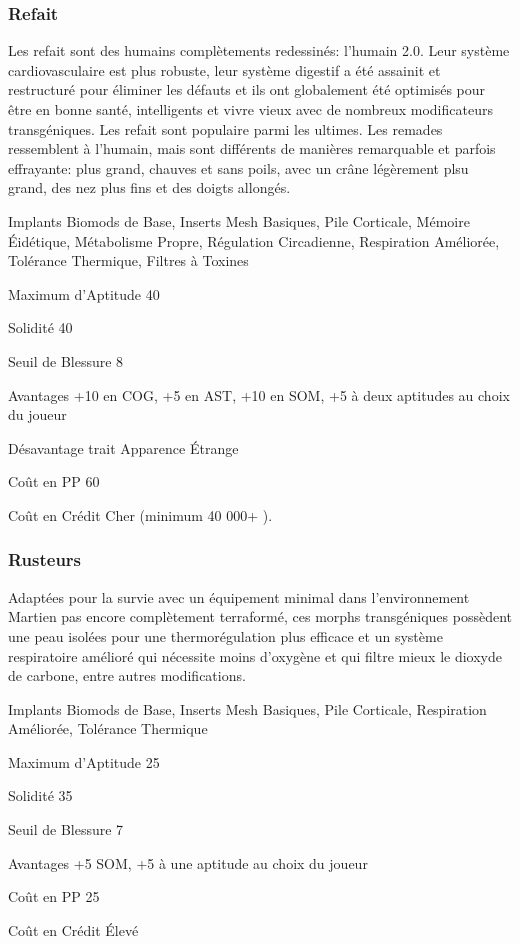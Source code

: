 \subsubsection{Refait} \label{sec:starting-remade} 

Les refait sont des humains complètements redessinés: l'humain 2.0. Leur système cardiovasculaire est plus robuste, leur système digestif a été assainit et restructuré pour éliminer les défauts et ils ont globalement été optimisés pour être en bonne santé, intelligents et vivre vieux avec de nombreux modificateurs transgéniques. Les refait sont populaire parmi les ultimes. Les remades ressemblent à l'humain, mais sont différents de manières remarquable et parfois effrayante: plus grand, chauves et sans poils, avec un crâne légèrement plsu grand, des nez plus fins et des doigts allongés. 

\begin{description*} \item[Implants] Biomods de Base, Inserts Mesh Basiques, Pile Corticale, Mémoire Éidétique, Métabolisme Propre, Régulation Circadienne, Respiration Améliorée, Tolérance Thermique, Filtres à Toxines\item[Maximum d'Aptitude] 40 \item[Solidité] 40 \item[Seuil de Blessure] 8 \item[Avantages] +10 en COG, +5 en AST, +10 en SOM, +5 à deux aptitudes au choix du joueur\item[Désavantage] trait Apparence Étrange \item[Coût en PP] 60 \item[Coût en Crédit] Cher (minimum 40 000+ ). \end{description*} 

\subsubsection{Rusteurs} \label{sec:starting-rusters} 

Adaptées pour la survie avec un équipement minimal dans l'environnement Martien pas encore complètement terraformé, ces morphs transgéniques possèdent une peau isolées pour une thermorégulation plus efficace et un système respiratoire amélioré qui nécessite moins d'oxygène et qui filtre mieux le dioxyde de carbone, entre autres modifications. 

\begin{description*} \item[Implants] Biomods de Base, Inserts Mesh Basiques, Pile Corticale, Respiration Améliorée, Tolérance Thermique\item[Maximum d'Aptitude] 25 \item[Solidité] 35 \item[Seuil de Blessure] 7 \item[Avantages] +5 SOM, +5 à une aptitude au choix du joueur\item[Coût en PP] 25 \item[Coût en Crédit] Élevé \end{description*} 

